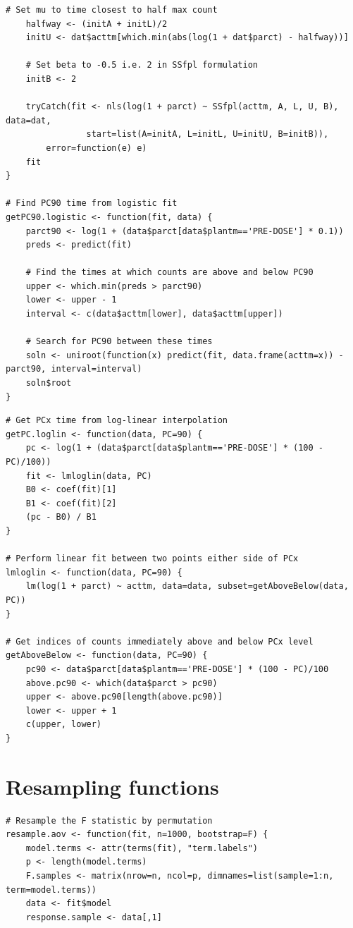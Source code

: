 \begin{singlespace}
\begin{lstlisting}[caption=Functions to find PC90 by logistic regression,label=R:logistics]
	# Set mu to time closest to half max count
	halfway <- (initA + initL)/2
	initU <- dat$acttm[which.min(abs(log(1 + dat$parct) - halfway))]

	# Set beta to -0.5 i.e. 2 in SSfpl formulation
	initB <- 2
	
	tryCatch(fit <- nls(log(1 + parct) ~ SSfpl(acttm, A, L, U, B), data=dat,
				start=list(A=initA, L=initL, U=initU, B=initB)),
		error=function(e) e)
	fit
}

# Find PC90 time from logistic fit
getPC90.logistic <- function(fit, data) {
	parct90 <- log(1 + (data$parct[data$plantm=='PRE-DOSE'] * 0.1))
	preds <- predict(fit)

	# Find the times at which counts are above and below PC90
	upper <- which.min(preds > parct90)
	lower <- upper - 1
	interval <- c(data$acttm[lower], data$acttm[upper])

	# Search for PC90 between these times
	soln <- uniroot(function(x) predict(fit, data.frame(acttm=x)) - parct90, interval=interval)
	soln$root
}
\end{lstlisting}

\begin{lstlisting}[caption=Functions to find PC90 by log-linear interpolation,label=R:loglinear]
# Get PCx time from log-linear interpolation
getPC.loglin <- function(data, PC=90) {
	pc <- log(1 + (data$parct[data$plantm=='PRE-DOSE'] * (100 - PC)/100))
	fit <- lmloglin(data, PC)
	B0 <- coef(fit)[1]
	B1 <- coef(fit)[2]
	(pc - B0) / B1
}

# Perform linear fit between two points either side of PCx
lmloglin <- function(data, PC=90) {
	lm(log(1 + parct) ~ acttm, data=data, subset=getAboveBelow(data, PC))
}

# Get indices of counts immediately above and below PCx level
getAboveBelow <- function(data, PC=90) {
	pc90 <- data$parct[data$plantm=='PRE-DOSE'] * (100 - PC)/100
	above.pc90 <- which(data$parct > pc90)
	upper <- above.pc90[length(above.pc90)]
	lower <- upper + 1
	c(upper, lower)
}
\end{lstlisting}

\section{Resampling functions}
\begin{lstlisting}[caption=Functions for resampling $F$ statistic,label=R:Fresamp]
# Resample the F statistic by permutation
resample.aov <- function(fit, n=1000, bootstrap=F) {
	model.terms <- attr(terms(fit), "term.labels")
	p <- length(model.terms)
	F.samples <- matrix(nrow=n, ncol=p, dimnames=list(sample=1:n, term=model.terms))
	data <- fit$model
	response.sample <- data[,1]


\end{lstlisting}
\end{singlespace}
